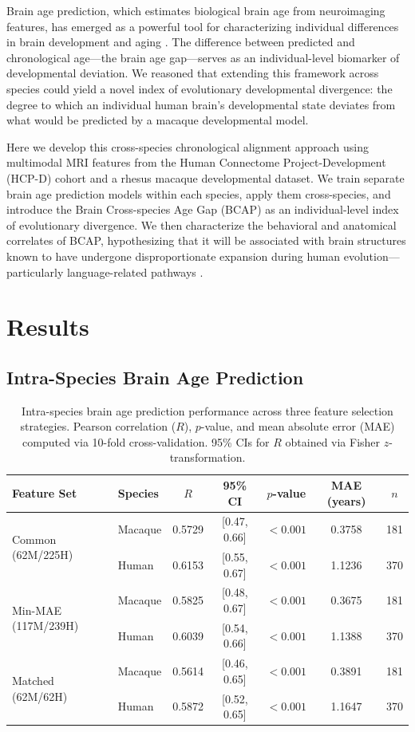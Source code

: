 \documentclass[11pt]{article}
\begin{document}
Brain age prediction, which estimates biological brain age from neuroimaging features, has emerged as a powerful tool for characterizing individual differences in brain development and aging \citep{cole2017surface, franke2019ten}. The difference between predicted and chronological age---the brain age gap---serves as an individual-level biomarker of developmental deviation. We reasoned that extending this framework across species could yield a novel index of evolutionary developmental divergence: the degree to which an individual human brain's developmental state deviates from what would be predicted by a macaque developmental model.

Here we develop this cross-species chronological alignment approach using multimodal MRI features from the Human Connectome Project-Development (HCP-D) cohort \citep{somerville2018lifespan} and a rhesus macaque developmental dataset. We train separate brain age prediction models within each species, apply them cross-species, and introduce the Brain Cross-species Age Gap (BCAP) as an individual-level index of evolutionary divergence. We then characterize the behavioral and anatomical correlates of BCAP, hypothesizing that it will be associated with brain structures known to have undergone disproportionate expansion during human evolution---particularly language-related pathways \citep{catani2005perisylvian, friederici2011brain}.

\section{Results}

\subsection{Intra-Species Brain Age Prediction}

\begin{table}[H]
\centering
\caption{Intra-species brain age prediction performance across three feature selection strategies. Pearson correlation ($R$), $p$-value, and mean absolute error (MAE) computed via 10-fold cross-validation. 95\% CIs for $R$ obtained via Fisher $z$-transformation.}
\label{tab:intra}
\begin{tabular}{llccccc}
\toprule
Feature Set & Species & $R$ & 95\% CI & $p$-value & MAE (years) & $n$ \\
\midrule
\multirow{2}{*}{Common (62M/225H)} & Macaque & 0.5729 & [0.47, 0.66] & $< 0.001$ & 0.3758 & 181 \\
 & Human & 0.6153 & [0.55, 0.67] & $< 0.001$ & 1.1236 & 370 \\
\midrule
\multirow{2}{*}{Min-MAE (117M/239H)} & Macaque & 0.5825 & [0.48, 0.67] & $< 0.001$ & 0.3675 & 181 \\
 & Human & 0.6039 & [0.54, 0.66] & $< 0.001$ & 1.1388 & 370 \\
\midrule
\multirow{2}{*}{Matched (62M/62H)} & Macaque & 0.5614 & [0.46, 0.65] & $< 0.001$ & 0.3891 & 181 \\
 & Human & 0.5872 & [0.52, 0.65] & $< 0.001$ & 1.1647 & 370 \\
\bottomrule
\end{tabular}
\end{table}
\end{document}
